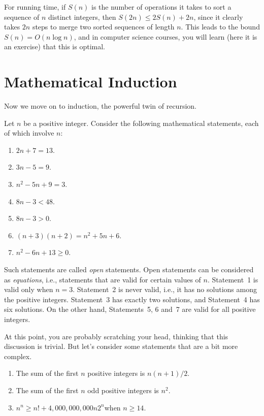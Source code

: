 For running time, if $S(n)$ is the number of operations it takes
to sort a sequence of $n$ distinct integers, then $S(2n)\le2 S(n) + 2n$,
since it clearly takes $2n$ steps to merge two sorted sequences
of length $n$.  This leads to the bound  $S(n) = O(n\log n)$,
and in computer science courses, you will learn (here it is an
exercise) that this is optimal.

\section{Mathematical Induction}\label{s:induction:induction}

Now we move on to induction, the powerful twin of recursion.

Let $n$ be a positive integer. Consider the following mathematical 
statements, each of which involve $n$:

\begin{enumerate}
\item $2n+7 = 13$.
\item $3n-5=9$.
\item $n^2-5n+9=3$.
\item $8n-3 < 48$.
\item $8n-3 > 0$.
\item $(n+3)(n+2) =n^2+5n+6$.
\item $n^2 -6n + 13 \ge 0$.
\end{enumerate}

Such statements are called \textit{open} statements.  Open statements
can be considered as \textit{equations}, i.e., statements that are
valid for certain values of $n$.  Statement~1 is valid only when
$n=3$.  Statement~2 is never valid, i.e., it has no solutions among
the positive integers. Statement~3 has exactly two solutions, and
Statement~4 has six solutions.  On the other hand, Statements~5, 6
and~7 are valid for all positive integers.

At this point, you are probably scratching your head, thinking that
this discussion is trivial.  But let's consider some statements that
are a bit more complex.

\begin{enumerate}
\item The sum of the first $n$ positive integers is $n(n+1)/2$.
\item The sum of the first $n$ odd positive integers is $n^2$.
\item $n^n \ge  n! + 4,000,000,000n2^n$\quad when $n\ge 14$.
\end{enumerate}

